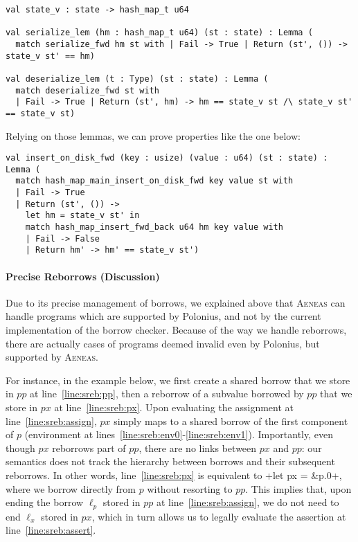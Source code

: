 \documentclass[acmsmall,screen]{acmart}
\newif\iflong
\newcommand{\aeneas}{\textsc{Aeneas}\xspace}
\newcommand\myparagraph[1]{\emph{#1}.\ }
\let\myparagraph\paragraph
\begin{document}
\begin{verbatim}
val state_v : state -> hash_map_t u64

val serialize_lem (hm : hash_map_t u64) (st : state) : Lemma (
  match serialize_fwd hm st with | Fail -> True | Return (st', ()) -> state_v st' == hm)

val deserialize_lem (t : Type) (st : state) : Lemma (
  match deserialize_fwd st with
  | Fail -> True | Return (st', hm) -> hm == state_v st /\ state_v st' == state_v st)
\end{verbatim}

Relying on those lemmas, we can prove properties like the one below:

\begin{verbatim}
val insert_on_disk_fwd (key : usize) (value : u64) (st : state) : Lemma (
  match hash_map_main_insert_on_disk_fwd key value st with
  | Fail -> True
  | Return (st', ()) ->
    let hm = state_v st' in
    match hash_map_insert_fwd_back u64 hm key value with
    | Fail -> False
    | Return hm' -> hm' == state_v st')
\end{verbatim}
\fi

\iflong
\myparagraph{Precise Reborrows (Discussion)}

Due to its precise management of borrows, we explained above that \aeneas can handle programs which
are supported by Polonius, and not by the current implementation of the borrow checker.
Because of the way we handle reborrows, there are actually cases of programs deemed invalid
even by Polonius, but supported by \aeneas.

For instance, in the example below, we first create a shared borrow that we store in
$pp$ at line~\ref{line:sreb:pp},
then a reborrow of a subvalue borrowed by $pp$ that we store in $px$ at line~\ref{line:sreb:px}.
Upon evaluating the assignment at line~\ref{line:sreb:assign}, $px$ simply maps
to a shared borrow of the first component of $p$ (environment at
lines~\ref{line:sreb:env0}-\ref{line:sreb:env1}).
Importantly, even though $px$ reborrows part of $pp$, there are no links
between $px$ and $pp$: our semantics does not
track the hierarchy between borrows and their subsequent reborrows.
In other words, line~\ref{line:sreb:px} is equivalent to \li+let px = &p.0+, where we borrow
directly from $p$ without resorting to $pp$.
This implies that, upon ending the borrow $\ell_p$ stored in $pp$ at
line~\ref{line:sreb:assign}, we do not need to end $\ell_x$ stored in $px$,
which in turn allows us to legally evaluate the assertion at line~\ref{line:sreb:assert}.
\end{document}
